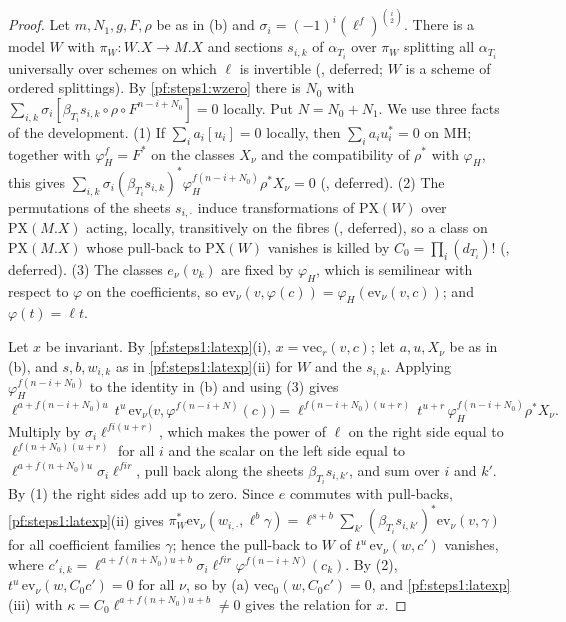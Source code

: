 \begin{proof}
Let $m,N_1,g,F,\rho$ be as in (b) and $\sigma_i=(-1)^i(\ell^f)^{\binom i2}$. There is a model $W$ with $\pi_W\colon W.X\to M.X$ and
sections $s_{i,k}$ of $\alpha_{T_i}$ over $\pi_W$ splitting all $\alpha_{T_i}$ universally over schemes on which $\ell$ is invertible
(, deferred; $W$ is a scheme of ordered splittings). By \cref{pf:steps1:wzero}
there is $N_0$ with $\sum_{i,k}\sigma_i[\beta_{T_i}s_{i,k}\circ\rho\circ F^{n-i+N_0}]=0$ locally. Put $N=N_0+N_1$. We use three facts
of the development. (1) If $\sum_ia_i[u_i]=0$ locally, then $\sum_ia_iu_i^*=0$ on $\mathrm{MH}$; together with $\varphi_H^f=F^*$ on the
classes $X_\nu$ and the compatibility of $\rho^*$ with $\varphi_H$, this gives
$\sum_{i,k}\sigma_i(\beta_{T_i}s_{i,k})^*\varphi_H^{f(n-i+N_0)}\rho^*X_\nu=0$ (,
deferred). (2) The permutations of the sheets $s_{i,\cdot}$ induce transformations of $\mathrm{PX}(W)$ over $\mathrm{PX}(M.X)$ acting,
locally, transitively on the fibres (, deferred), so a class on
$\mathrm{PX}(M.X)$ whose pull-back to $\mathrm{PX}(W)$ vanishes is killed by $C_0=\prod_i(d_{T_i})!$
(, deferred). (3) The classes $e_\nu(v_k)$ are fixed by $\varphi_H$, which is
semilinear with respect to $\varphi$ on the coefficients, so $\mathrm{ev}_\nu(v,\varphi(c))=\varphi_H(\mathrm{ev}_\nu(v,c))$; and
$\varphi(t)=\ell t$.

Let $x$ be invariant. By \cref{pf:steps1:latexp}(i), $x=\mathrm{vec}_r(v,c)$; let $a,u,X_\nu$ be as in (b), and $s,b,w_{i,k}$ as in
\cref{pf:steps1:latexp}(ii) for $W$ and the $s_{i,k}$. Applying $\varphi_H^{f(n-i+N_0)}$ to the identity in (b) and using (3) gives
\[
 \ell^{a+f(n-i+N_0)u}\,t^u\,\mathrm{ev}_\nu\bigl(v,\varphi^{f(n-i+N)}(c)\bigr)=\ell^{f(n-i+N_0)(u+r)}\,t^{u+r}\,
 \varphi_H^{f(n-i+N_0)}\rho^*X_\nu .
\]
Multiply by $\sigma_i\ell^{fi(u+r)}$, which makes the power of $\ell$ on the right side equal to $\ell^{f(n+N_0)(u+r)}$ for all $i$ and
the scalar on the left side equal to $\ell^{a+f(n+N_0)u}\sigma_i\ell^{fir}$, pull back along the sheets $\beta_{T_i}s_{i,k'}$, and sum
over $i$ and $k'$. By (1) the right sides add up to zero. Since $e$ commutes with pull-backs, \cref{pf:steps1:latexp}(ii) gives
$\pi_W^*\mathrm{ev}_\nu(w_{i,\cdot},\ell^b\gamma)=\ell^{s+b}\sum_{k'}(\beta_{T_i}s_{i,k'})^*\mathrm{ev}_\nu(v,\gamma)$ for all coefficient
families $\gamma$; hence the pull-back to $W$ of $t^u\,\mathrm{ev}_\nu(w,c')$ vanishes, where $c'_{i,k}=\ell^{a+f(n+N_0)u+b}\sigma_i
\ell^{fir}\varphi^{f(n-i+N)}(c_k)$. By (2), $t^u\,\mathrm{ev}_\nu(w,C_0c')=0$ for all $\nu$, so by (a) $\mathrm{vec}_0(w,C_0c')=0$, and
\cref{pf:steps1:latexp}(iii) with $\kappa=C_0\ell^{a+f(n+N_0)u+b}\ne0$ gives the relation for $x$.
\end{proof}

